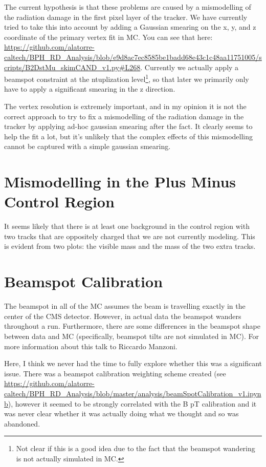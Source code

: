 \documentclass[12pt]{report}
\begin{document}
The current hypothesis is that these problems are caused by a mismodelling of
the radiation damage in the first pixel layer of the tracker. We have currently
tried to take this into account by adding a Gaussian smearing on the x, y, and
z coordinate of the primary vertex fit in MC. You can see that here:
\url{https://github.com/alatorre-caltech/BPH_RD_Analysis/blob/e9d8ac7ec8585be1badd68e43c1c48aa11751005/scripts/B2DstMu_skimCAND_v1.py#L268}.
Currently we actually apply a beamspot constraint at the ntuplization
level\footnote{Not clear if this is a good idea due to the fact that the
beamspot wandering is not actually simulated in MC.}, so that later we
primarily only have to apply a significant smearing in the z direction.

The vertex resolution is extremely important, and in my opinion it is not the
correct approach to try to fix a mismodelling of the radiation damage in the
tracker by applying ad-hoc gaussian smearing after the fact. It clearly seems
to help the fit a lot, but it's unlikely that the complex effects of this
mismodelling cannot be captured with a simple gaussian smearing.

\section{Mismodelling in the Plus Minus Control Region}
It seems likely that there is at least one background in the control region
with two tracks that are oppositely charged that we are not currently modeling.
This is evident from two plots: the visible mass and the mass of the two extra
tracks.

\section{Beamspot Calibration}
The beamspot in all of the MC assumes the beam is travelling exactly in the
center of the CMS detector. However, in actual data the beamspot wanders
throughout a run. Furthermore, there are some differences in the beamspot shape
between data and MC (specifically, beamspot tilts are not simulated in MC). For
more information about this talk to Riccardo Manzoni.

Here, I think we never had the time to fully explore whether this was a
significant issue. There was a beamspot calibration weighting scheme created
(see
\url{https://github.com/alatorre-caltech/BPH_RD_Analysis/blob/master/analysis/beamSpotCalibration_v1.ipynb}),
however it seemed to be strongly correlated with the B pT calibration and it
was never clear whether it was actually doing what we thought and so was
abandoned.
\end{document}
